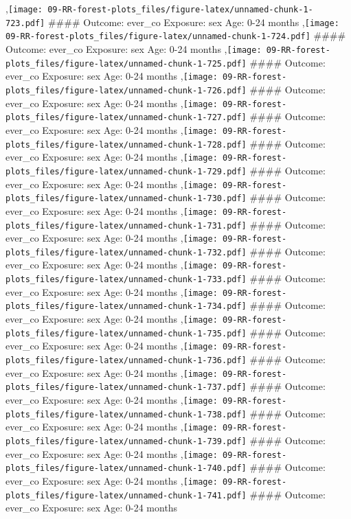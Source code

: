 \documentclass[
  9pt,
]{book}
\begin{document}
,\texttt{[image: 09-RR-forest-plots\_files/figure-latex/unnamed-chunk-1-723.pdf]}
\#\#\#\# Outcome: ever\_co Exposure: sex Age: 0-24 months
,\texttt{[image: 09-RR-forest-plots\_files/figure-latex/unnamed-chunk-1-724.pdf]}
\#\#\#\# Outcome: ever\_co Exposure: sex Age: 0-24 months
,\texttt{[image: 09-RR-forest-plots\_files/figure-latex/unnamed-chunk-1-725.pdf]}
\#\#\#\# Outcome: ever\_co Exposure: sex Age: 0-24 months
,\texttt{[image: 09-RR-forest-plots\_files/figure-latex/unnamed-chunk-1-726.pdf]}
\#\#\#\# Outcome: ever\_co Exposure: sex Age: 0-24 months
,\texttt{[image: 09-RR-forest-plots\_files/figure-latex/unnamed-chunk-1-727.pdf]}
\#\#\#\# Outcome: ever\_co Exposure: sex Age: 0-24 months
,\texttt{[image: 09-RR-forest-plots\_files/figure-latex/unnamed-chunk-1-728.pdf]}
\#\#\#\# Outcome: ever\_co Exposure: sex Age: 0-24 months
,\texttt{[image: 09-RR-forest-plots\_files/figure-latex/unnamed-chunk-1-729.pdf]}
\#\#\#\# Outcome: ever\_co Exposure: sex Age: 0-24 months
,\texttt{[image: 09-RR-forest-plots\_files/figure-latex/unnamed-chunk-1-730.pdf]}
\#\#\#\# Outcome: ever\_co Exposure: sex Age: 0-24 months
,\texttt{[image: 09-RR-forest-plots\_files/figure-latex/unnamed-chunk-1-731.pdf]}
\#\#\#\# Outcome: ever\_co Exposure: sex Age: 0-24 months
,\texttt{[image: 09-RR-forest-plots\_files/figure-latex/unnamed-chunk-1-732.pdf]}
\#\#\#\# Outcome: ever\_co Exposure: sex Age: 0-24 months
,\texttt{[image: 09-RR-forest-plots\_files/figure-latex/unnamed-chunk-1-733.pdf]}
\#\#\#\# Outcome: ever\_co Exposure: sex Age: 0-24 months
,\texttt{[image: 09-RR-forest-plots\_files/figure-latex/unnamed-chunk-1-734.pdf]}
\#\#\#\# Outcome: ever\_co Exposure: sex Age: 0-24 months
,\texttt{[image: 09-RR-forest-plots\_files/figure-latex/unnamed-chunk-1-735.pdf]}
\#\#\#\# Outcome: ever\_co Exposure: sex Age: 0-24 months
,\texttt{[image: 09-RR-forest-plots\_files/figure-latex/unnamed-chunk-1-736.pdf]}
\#\#\#\# Outcome: ever\_co Exposure: sex Age: 0-24 months
,\texttt{[image: 09-RR-forest-plots\_files/figure-latex/unnamed-chunk-1-737.pdf]}
\#\#\#\# Outcome: ever\_co Exposure: sex Age: 0-24 months
,\texttt{[image: 09-RR-forest-plots\_files/figure-latex/unnamed-chunk-1-738.pdf]}
\#\#\#\# Outcome: ever\_co Exposure: sex Age: 0-24 months
,\texttt{[image: 09-RR-forest-plots\_files/figure-latex/unnamed-chunk-1-739.pdf]}
\#\#\#\# Outcome: ever\_co Exposure: sex Age: 0-24 months
,\texttt{[image: 09-RR-forest-plots\_files/figure-latex/unnamed-chunk-1-740.pdf]}
\#\#\#\# Outcome: ever\_co Exposure: sex Age: 0-24 months
,\texttt{[image: 09-RR-forest-plots\_files/figure-latex/unnamed-chunk-1-741.pdf]}
\#\#\#\# Outcome: ever\_co Exposure: sex Age: 0-24 months
\end{document}

